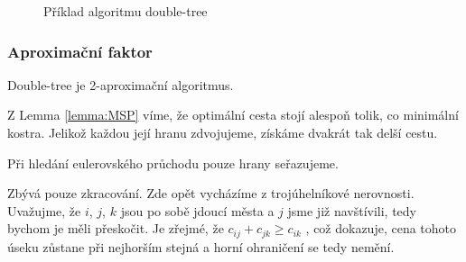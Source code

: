 \documentclass[
  printversion=false,
  joinlists=true,
  glossaries=true,
  figures=true,
  tables=true,
  sourcecodes=false,
  theorems=false,
  bibencoding=utf8,
  language=czech,
  encoding=utf8,
  program=infpvs,
  index=true,
  biblatex=true
]{kidiplom}
\begin{document}
\begin{figure}[H]
\begin{example}
      \hfill
    \end{example}
    \caption{Příklad algoritmu double-tree}
\end{figure}

\pagebreak

\subsubsection{Aproximační faktor}
\begin{theorem}
Double-tree je 2-aproximační algoritmus.
\end{theorem}
	Z Lemma \ref{lemma:MSP} víme, že optimální cesta stojí alespoň tolik, co minimální kostra. Jelikož každou její hranu zdvojujeme, získáme dvakrát tak delší cestu.
	
	Při hledání eulerovského průchodu pouze hrany seřazujeme.
	
	Zbývá pouze zkracování. Zde opět vycházíme z trojúhelníkové nerovnosti. Uvažujme, že $i$, $j$, $k$ jsou po sobě jdoucí města a $j$ jsme již navštívili, tedy bychom je měli přeskočit. Je zřejmé, že $c_{ij} + c_{jk} \ge c_{ik}$ , což dokazuje, cena tohoto úseku zůstane při nejhorším stejná a horní ohraničení se tedy nemění.
	
\end{document}
